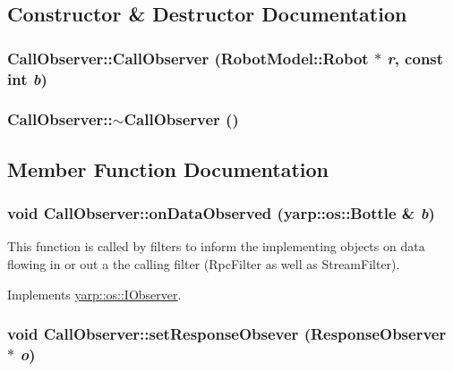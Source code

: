 \subsection{Constructor \& Destructor Documentation}
\hypertarget{class_call_observer_abc4eedb5f415fe0573cbd652554a5cd3}{
\subsubsection[{CallObserver}]{\setlength{\rightskip}{0pt plus 5cm}CallObserver::CallObserver ({\bf RobotModel::Robot} $\ast$ {\em r}, \/  const int {\em b})}}
\label{class_call_observer_abc4eedb5f415fe0573cbd652554a5cd3}
\hypertarget{class_call_observer_aa357a50f75f42bfc944af11f41265fee}{
\subsubsection[{$\sim$CallObserver}]{\setlength{\rightskip}{0pt plus 5cm}CallObserver::$\sim$CallObserver ()}}
\label{class_call_observer_aa357a50f75f42bfc944af11f41265fee}


\subsection{Member Function Documentation}
\hypertarget{class_call_observer_abc1974fe2f04101dbbb1ae3ce83e7bfe}{
\subsubsection[{onDataObserved}]{\setlength{\rightskip}{0pt plus 5cm}void CallObserver::onDataObserved (yarp::os::Bottle \& {\em b})}}
\label{class_call_observer_abc1974fe2f04101dbbb1ae3ce83e7bfe}
This function is called by filters to inform the implementing objects on data flowing in or out a the calling filter (RpcFilter as well as StreamFilter). 

Implements \hyperlink{classyarp_1_1os_1_1_i_observer_a4829e5a6f2ba6666b9539a4a30f20790}{yarp::os::IObserver}.\hypertarget{class_call_observer_a7551cd8674e37faa25451d78150f6a7c}{
\subsubsection[{setResponseObsever}]{\setlength{\rightskip}{0pt plus 5cm}void CallObserver::setResponseObsever ({\bf ResponseObserver} $\ast$ {\em o})}}
\label{class_call_observer_a7551cd8674e37faa25451d78150f6a7c}


